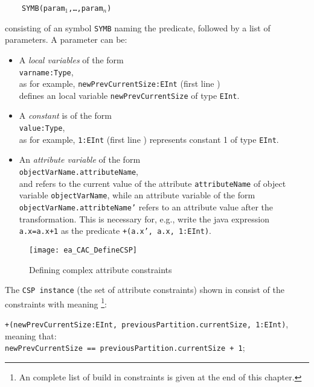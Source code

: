 ~~~~\texttt{SYMB(param$_1$,\ldots,param$_n$)}

\noindent consisting of an symbol \texttt{SYMB} naming the predicate, followed by a list of parameters. A parameter can be:
\begin{itemize}
    \item A \emph{local variables} of the form \\
    \hspace*{0.5cm} \texttt{varname:Type},\\
    as for example, \texttt{newPrevCurrentSize:EInt} (first line )\\
     defines an local variable \texttt{newPrevCurrentSize} of type \texttt{EInt}. 
    \item A \emph{constant} is of the form \\
    \hspace*{0.5cm} \texttt{value:Type},\\
    as for example, \texttt{1:EInt} (first line ) represents constant 1 of type \texttt{EInt}.
    \item An \emph{attribute variable} of the form \\
    \hspace*{0.5cm}\texttt{objectVarName.attributeName}, \\
     and refers to the current value of the attribute \texttt{attributeName} of object variable 	\texttt{objectVarName}, while an attribute variable of the form \texttt{objectVarName.attribteName'} refers to an attribute value after the transformation. This is necessary for, 	e.g., write the java expression \texttt{a.x=a.x+1} as the predicate \texttt{+(a.x', a.x, 1:EInt)}. 
\end{itemize}


 
\begin{figure}[htbp]
\begin{center}
  \texttt{[image: ea\_CAC\_DefineCSP]}
  \caption{Defining complex attribute constraints}  
  \label{ea:ea_CAC_DefineCSP}
\end{center}
\end{figure}

The \texttt{CSP instance} (the set of attribute constraints) shown in  consist of the constraints with meaning \footnote{An complete list of build in constraints is given at the end of this chapter.}:

\hspace*{0.5cm}\texttt{\small +(newPrevCurrentSize:EInt, previousPartition.currentSize, 1:EInt)},\\
meaning that:\\
\hspace*{0.5cm}\texttt{\small newPrevCurrentSize == previousPartition.currentSize + 1};

